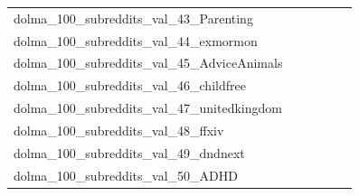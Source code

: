 \documentclass[dvipsnames]{article}
\begin{document}
\begin{appendix}
{\begin{longtable}{m{6cm}m{1.7cm}m{1.7cm}m{1.7cm}m{1.7cm}m{1.7cm}}
	dolma\_100\_subreddits\_val\_43\_Parenting  & \colorbox[HTML]{ffffe5}{\makebox[\mywidth][c]{20.15}} & \colorbox[HTML]{98d485}{\makebox[\mywidth][c]{19.11}} & \colorbox[HTML]{ffffe5}{\makebox[\mywidth][c]{20.43}} & \colorbox[HTML]{e6f5ad}{\makebox[\mywidth][c]{19.30}} & \colorbox[HTML]{77c578}{\makebox[\mywidth][c]{19.06}}\\
	dolma\_100\_subreddits\_val\_44\_exmormon  & \colorbox[HTML]{ffffe5}{\makebox[\mywidth][c]{23.12}} & \colorbox[HTML]{9dd687}{\makebox[\mywidth][c]{21.90}} & \colorbox[HTML]{ffffe5}{\makebox[\mywidth][c]{23.44}} & \colorbox[HTML]{c8e89a}{\makebox[\mywidth][c]{21.99}} & \colorbox[HTML]{77c578}{\makebox[\mywidth][c]{21.84}}\\
	dolma\_100\_subreddits\_val\_45\_AdviceAnimals  & \colorbox[HTML]{ffffe5}{\makebox[\mywidth][c]{22.14}} & \colorbox[HTML]{d5eea1}{\makebox[\mywidth][c]{20.96}} & \colorbox[HTML]{ffffe5}{\makebox[\mywidth][c]{22.14}} & \colorbox[HTML]{ddf1a6}{\makebox[\mywidth][c]{20.98}} & \colorbox[HTML]{77c578}{\makebox[\mywidth][c]{20.79}}\\
	dolma\_100\_subreddits\_val\_46\_childfree  & \colorbox[HTML]{ffffe5}{\makebox[\mywidth][c]{21.87}} & \colorbox[HTML]{c3e698}{\makebox[\mywidth][c]{20.85}} & \colorbox[HTML]{ffffe5}{\makebox[\mywidth][c]{22.13}} & \colorbox[HTML]{d7efa2}{\makebox[\mywidth][c]{20.89}} & \colorbox[HTML]{77c578}{\makebox[\mywidth][c]{20.72}}\\
	dolma\_100\_subreddits\_val\_47\_unitedkingdom  & \colorbox[HTML]{ffffe5}{\makebox[\mywidth][c]{23.27}} & \colorbox[HTML]{c9e99b}{\makebox[\mywidth][c]{22.00}} & \colorbox[HTML]{ffffe5}{\makebox[\mywidth][c]{23.40}} & \colorbox[HTML]{c8e89a}{\makebox[\mywidth][c]{22.00}} & \colorbox[HTML]{77c578}{\makebox[\mywidth][c]{21.85}}\\
	dolma\_100\_subreddits\_val\_48\_ffxiv  & \colorbox[HTML]{ffffe5}{\makebox[\mywidth][c]{32.53}} & \colorbox[HTML]{b3df91}{\makebox[\mywidth][c]{30.79}} & \colorbox[HTML]{ffffe5}{\makebox[\mywidth][c]{33.33}} & \colorbox[HTML]{def2a6}{\makebox[\mywidth][c]{31.01}} & \colorbox[HTML]{77c578}{\makebox[\mywidth][c]{30.62}}\\
	dolma\_100\_subreddits\_val\_49\_dndnext  & \colorbox[HTML]{ffffe5}{\makebox[\mywidth][c]{29.67}} & \colorbox[HTML]{dbf1a4}{\makebox[\mywidth][c]{28.03}} & \colorbox[HTML]{ffffe5}{\makebox[\mywidth][c]{30.53}} & \colorbox[HTML]{f2fab5}{\makebox[\mywidth][c]{28.26}} & \colorbox[HTML]{77c578}{\makebox[\mywidth][c]{27.63}}\\
	dolma\_100\_subreddits\_val\_50\_ADHD  & \colorbox[HTML]{ffffe5}{\makebox[\mywidth][c]{20.75}} & \colorbox[HTML]{9bd587}{\makebox[\mywidth][c]{19.83}} & \colorbox[HTML]{ffffe5}{\makebox[\mywidth][c]{21.14}} & \colorbox[HTML]{d5eea1}{\makebox[\mywidth][c]{19.95}} & \colorbox[HTML]{77c578}{\makebox[\mywidth][c]{19.78}}\\

\end{longtable}}
\end{appendix}
\end{document}
